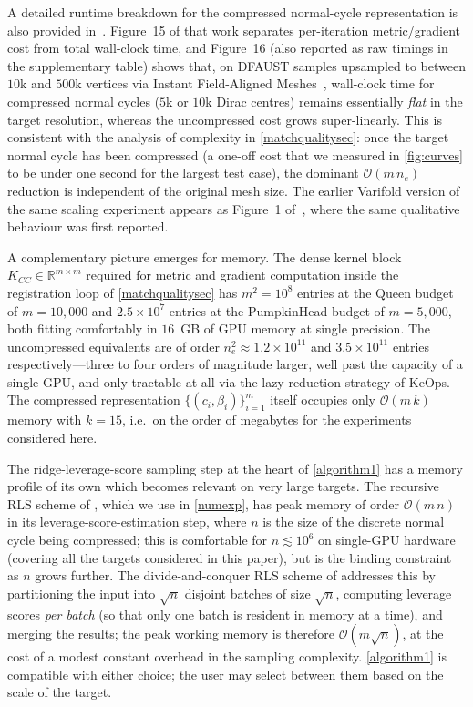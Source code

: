 \documentclass[sn-mathphys-num]{sn-jnl}%
\theoremstyle{thmstyleone}%
\theoremstyle{thmstyletwo}%
\theoremstyle{thmstylethree}%
\numberwithin{remark}{section}
\numberwithin{definition}{section}
\numberwithin{equation}{section}
\numberwithin{theorem}{section}
\newcommand{\R}{\ensuremath{\mathbb{R}}}%
\begin{document}
A detailed runtime breakdown for the compressed normal-cycle
representation is also provided in~\cite{CurvatureEnthusiasm}. Figure~15
of that work separates per-iteration metric/gradient cost from
total wall-clock time, and Figure~16 (also reported as raw timings in
the supplementary table) shows that, on DFAUST samples upsampled to
between $10$k and $500$k vertices via Instant Field-Aligned
Meshes~\cite{Jakob2015IFA}, wall-clock time for compressed normal
cycles ($5$k or $10$k Dirac centres) remains essentially \textit{flat}
in the target resolution, whereas the uncompressed cost grows
super-linearly. This is consistent with the analysis of complexity in
\cref{matchqualitysec}: once the target normal cycle has been
compressed (a one-off cost that we measured in \cref{fig:curves} to be
under one second for the largest test case), the dominant
$\mathcal{O}(m\,n_{e})$ reduction is independent of the original mesh
size. The earlier Varifold version of the same scaling experiment
appears as Figure~1 of~\cite{ARCFlow}, where the same qualitative
behaviour was first reported.

A complementary picture emerges for memory. The dense kernel block
$K_{CC} \in \R^{m\times m}$ required for metric and gradient
computation inside the registration loop of \cref{matchqualitysec} has
$m^{2}=10^{8}$ entries at the Queen budget of $m=10{,}000$ and
$2.5\times 10^{7}$ entries at the PumpkinHead budget of $m=5{,}000$,
both fitting comfortably in $16$~GB of GPU memory at single precision.
The uncompressed equivalents are of order $n_{e}^{2}\approx 1.2\times
10^{11}$ and $3.5\times 10^{11}$ entries respectively---three to four
orders of magnitude larger, well past the capacity of a single GPU, and
only tractable at all via the lazy reduction strategy of KeOps. The
compressed representation $\{(c_{i},\beta_{i})\}_{i=1}^{m}$ itself
occupies only $\mathcal{O}(m\,k)$ memory with $k=15$, i.e.\ on the
order of megabytes for the experiments considered here.

The ridge-leverage-score sampling step at the heart of
\cref{algorithm1} has a memory profile of its own which becomes
relevant on very large targets. The recursive RLS scheme of
\cite{Musco}, which we use in \cref{numexp}, has peak memory of order
$\mathcal{O}(m\,n)$ in its leverage-score-estimation step, where $n$
is the size of the discrete normal cycle being compressed; this is
comfortable for $n\lesssim 10^{6}$ on single-GPU hardware (covering
all the targets considered in this paper), but is the binding
constraint as $n$ grows further. The divide-and-conquer RLS scheme of
\cite{DAC} addresses this by partitioning the input into $\sqrt{n}$
disjoint batches of size $\sqrt{n}$, computing leverage scores
\textit{per batch} (so that only one batch is resident in memory at a
time), and merging the results; the peak working memory is therefore
$\mathcal{O}(m\sqrt{n})$, at the cost of a modest constant overhead in
the sampling complexity.
\cref{algorithm1} is compatible with either choice; the user may
select between them based on the scale of the target.
\end{document}
